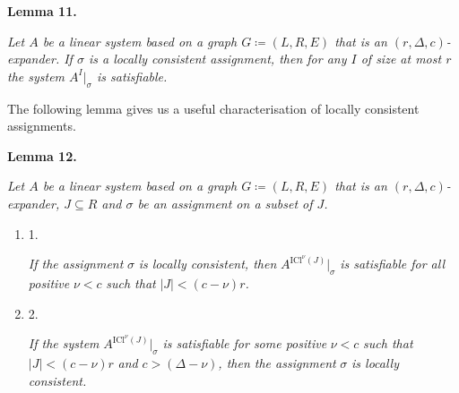 \documentclass[10pt,a4paper]{article}
\begin{document}


\par\medskip\noindent\textbf{
\textbf{Lemma 11}\textbf{.}
}\par



\emph{Let $A$ be a linear system based on a graph $G\coloneqq(L,R,E)$ that is an $(r,\Delta,c)$-expander. If $\sigma$ is a locally consistent assignment, then for any $I$ of size at most $r$
the system $A^{I}|_{\sigma}$ is satisfiable.}\par






The following lemma gives us a useful characterisation of locally consistent assignments.\par





\par\medskip\noindent\textbf{
\textbf{Lemma 12}\textbf{.}
}\par



\emph{Let $A$ be a linear system based on a graph $G\coloneqq(L,R,E)$ that is an $(r,\Delta,c)$-expander, $J\subseteq R$ and $\sigma$ be an assignment on a subset of $J$.}\par


\begin{enumerate}


\item[] 
1. 


\emph{If the assignment }$\sigma$\emph{ is locally consistent, then }$A^{\mathrm{ICl}^{\nu}\left(J\right)}|_{\sigma}$\emph{ is
satisfiable for all positive }$\nu<c$\emph{ such that }$|J|<(c-\nu)r$\emph{.}\par





\item[] 
2. 


\emph{If the system }$A^{\mathrm{ICl}^{\nu}\left(J\right)}|_{\sigma}$\emph{ is satisfiable for some positive }$\nu<c$\emph{
such that }$|J|<(c-\nu)r$\emph{ and }$c>(\Delta-\nu)$\emph{, then the assignment }$\sigma$\emph{ is
locally consistent.}\par





\end{enumerate}
\end{document}
